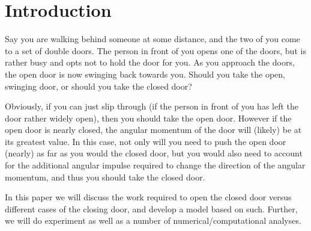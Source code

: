 \section{Introduction} \label{sec:Introduction}
    Say you are walking behind someone at some distance, and the two of you come to a set of double doors. The person in front of you opens one of the doors, but is rather busy and opts not to hold the door for you. As you approach the doors, the open door is now swinging back towards you. Should you take the open, swinging door, or should you take the closed door?

    Obviously, if you can just slip through (if the person in front of you has left the door rather widely open), then you should take the open door. However if the open door is nearly closed, the angular momentum of the door will (likely) be at its greatest value. In this case, not only will you need to push the open door (nearly) as far as you would the closed door, but you would also need to account for the additional angular impulse required to change the direction of the angular momentum, and thus you should take the closed door. 

    In this paper we will discuss the work required to open the closed door versus different cases of the closing door, and develop a model based on such. Further, we will do experiment as well as a number of numerical/computational analyses.